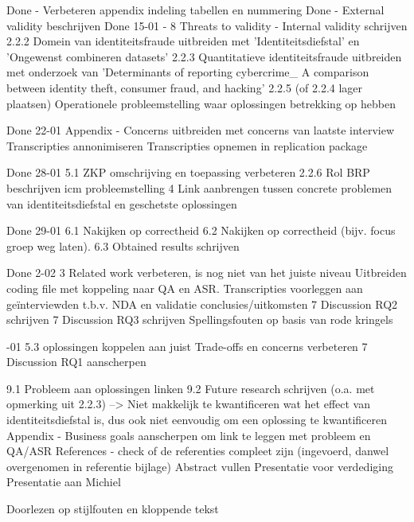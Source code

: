 Done - Verbeteren appendix indeling tabellen en nummering
Done - External validity beschrijven
Done 15-01 - 
8 Threats to validity - Internal validity schrijven
2.2.2 Domein van identiteitsfraude uitbreiden met 'Identiteitsdiefstal' en 'Ongewenst combineren datasets'
2.2.3 Quantitatieve identiteitsfraude uitbreiden met onderzoek van 'Determinants of reporting cybercrime_ A
comparison between identity theft, consumer fraud, and hacking'
2.2.5 (of 2.2.4 lager plaatsen) Operationele probleemstelling waar oplossingen betrekking op hebben

Done 22-01
Appendix - Concerns uitbreiden met concerns van laatste interview
Transcripties annonimiseren
Transcripties opnemen in replication package

Done 28-01
5.1 ZKP omschrijving en toepassing verbeteren
2.2.6 Rol BRP beschrijven icm probleemstelling
4 Link aanbrengen tussen concrete problemen van identiteitsdiefstal en geschetste oplossingen

Done 29-01
6.1 Nakijken op correctheid
6.2 Nakijken op correctheid (bijv. focus groep weg laten).
6.3 Obtained results schrijven

Done 2-02
3 Related work verbeteren, is nog niet van het juiste niveau
Uitbreiden coding file met koppeling naar QA en ASR.
Transcripties voorleggen aan geïnterviewden t.b.v. NDA en validatie conclusies/uitkomsten
7 Discussion RQ2 schrijven
7 Discussion RQ3 schrijven
Spellingsfouten op basis van rode kringels

-01
5.3 oplossingen koppelen aan juist Trade-offs en concerns verbeteren
7 Discussion RQ1 aanscherpen


9.1 Probleem aan oplossingen linken
9.2 Future research schrijven (o.a. met opmerking uit 2.2.3)
--> Niet makkelijk te kwantificeren wat het effect van identiteitsdiefstal is, dus ook niet eenvoudig om een oplossing te kwantificeren
Appendix - Business goals aanscherpen om link te leggen met probleem en QA/ASR
References - check of de referenties compleet zijn (ingevoerd, danwel overgenomen in referentie bijlage)
Abstract vullen
Presentatie voor verdediging
Presentatie aan Michiel

\todo

Doorlezen op stijlfouten en kloppende tekst
